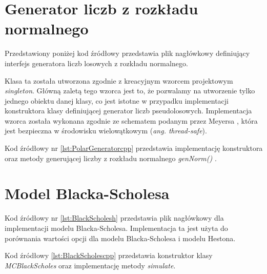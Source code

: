 \documentclass{pracamgr}
\begin{document}
\section{Generator liczb z rozkładu normalnego}
Przedstawiony poniżej kod źródłowy przedstawia plik nagłówkowy definiujący interfejs 
generatora liczb losowych z rozkładu normalnego. 
Klasa ta została utworzona zgodnie z kreacyjnym wzorcem projektowym \textit{singleton}. 
Główną zaletą tego wzorca jest to, że pozwalamy na utworzenie tylko jednego obiektu danej 
klasy, co jest istotne w przypadku implementacji konstruktora klasy definiującej
generator liczb pseudolosowych.
Implementacja wzorca została wykonana zgodnie ze schematem podanym przez Meyersa \cite{Meyers}, 
która jest bezpieczna w środowisku wielowątkowym (\textit{ang. thread-safe}).
Kod źródłowy nr \ref{lst:PolarGeneratorcpp} przedstawia implementację konstruktora oraz metody
generującej liczby z rozkładu normalnego \textit{genNorm()} \cite{joshi2008c++}.


\clearpage
\section{Model Blacka-Scholesa}
Kod źródłowy nr \ref{lst:BlackScholesh} przedstawia plik nagłówkowy dla implementacji 
modelu Blacka-Scholesa. Implementacja ta jest użyta do porównania wartości opcji dla 
modelu Blacka-Scholesa i modelu Hestona.
Kod źródłowy \ref{lst:BlackScholescpp} przedstawia konstruktor klasy \textit{MCBlackScholes} 
oraz implementację metody \textit{simulate}.
\end{document}
